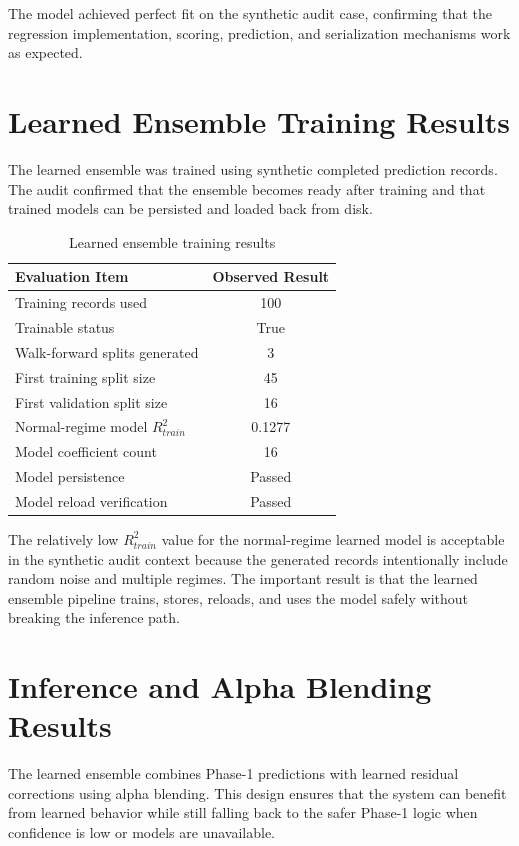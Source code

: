 \documentclass[12pt,a4paper]{report}
\begin{document}
The model achieved perfect fit on the synthetic audit case, confirming that the regression implementation, scoring, prediction, and serialization mechanisms work as expected.

\section{Learned Ensemble Training Results}

The learned ensemble was trained using synthetic completed prediction records. The audit confirmed that the ensemble becomes ready after training and that trained models can be persisted and loaded back from disk.

\begin{table}[H]
\centering
\caption{Learned ensemble training results}
\label{tab:learned_ensemble_results}
\begin{tabular}{|p{6cm}|c|}
\hline
\textbf{Evaluation Item} & \textbf{Observed Result} \\
\hline
Training records used & 100 \\
\hline
Trainable status & True \\
\hline
Walk-forward splits generated & 3 \\
\hline
First training split size & 45 \\
\hline
First validation split size & 16 \\
\hline
Normal-regime model $R^2_{train}$ & 0.1277 \\
\hline
Model coefficient count & 16 \\
\hline
Model persistence & Passed \\
\hline
Model reload verification & Passed \\
\hline
\end{tabular}
\end{table}

The relatively low $R^2_{train}$ value for the normal-regime learned model is acceptable in the synthetic audit context because the generated records intentionally include random noise and multiple regimes. The important result is that the learned ensemble pipeline trains, stores, reloads, and uses the model safely without breaking the inference path.

\section{Inference and Alpha Blending Results}

The learned ensemble combines Phase-1 predictions with learned residual corrections using alpha blending. This design ensures that the system can benefit from learned behavior while still falling back to the safer Phase-1 logic when confidence is low or models are unavailable.
\end{document}
